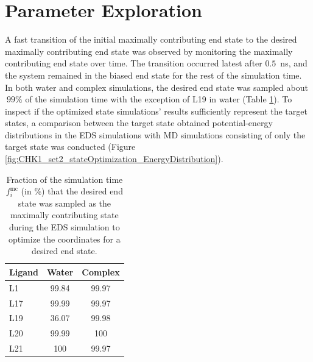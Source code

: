 
\section{Parameter Exploration}
A fast transition of the initial maximally contributing end state to the desired maximally contributing end state was observed by monitoring the maximally contributing end state over time.
The transition occurred latest after $0.5$~ns, and the system remained in the biased end state for the rest of the simulation time.
In both water and complex simulations, the desired end state was sampled about $~99\%$ of the simulation time with the exception of L19 in water (Table \ref{SItab:RingCycleOpenin_sampling_fraction_optimizedStates}).
To inspect if the optimized state simulations' results sufficiently represent the target states, a comparison between the target state obtained potential-energy distributions in the EDS simulations with MD simulations consisting of only the target state was conducted (Figure \ref{fig:CHK1_set2_stateOptimization_EnergyDistribution}). 

\begin{table}[H]
\centering
\caption{Fraction of the simulation time $f_i^{\text{mc}}$ (in \%) that the desired end state was sampled as the maximally contributing state during the EDS simulation to optimize the coordinates for a desired end state.}
\label{SItab:RingCycleOpenin_sampling_fraction_optimizedStates}
\begin{tabular}{ l | c c }
 Ligand & Water  & Complex \\ 
 \hline
     L1 & 99.84 & 99.97 \\ 
     L17 & 99.99 & 99.97\\
     L19 & 36.07 &  99.98\\
     L20 & 99.99 & 100\\
     L21 & 100 & 99.97 \\
\end{tabular}
\end{table}

